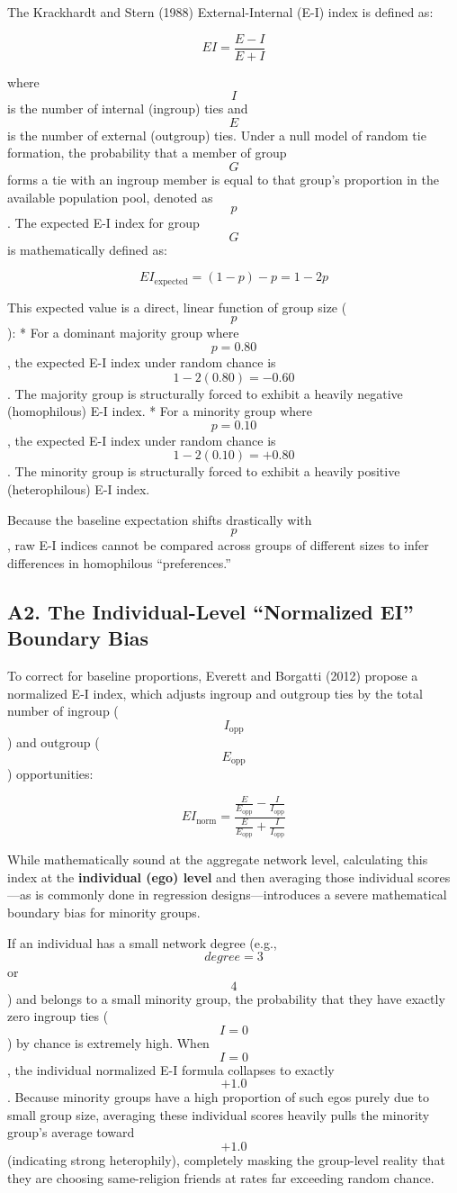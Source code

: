 \documentclass[
  letterpaper,
  DIV=11,
  numbers=noendperiod]{scrartcl}
\begin{document}
The Krackhardt and Stern (1988) External-Internal (E-I) index is defined
as:

\[EI = \frac{E - I}{E + I}\]

where \[I\] is the number of internal (ingroup) ties and \[E\] is the
number of external (outgroup) ties. Under a null model of random tie
formation, the probability that a member of group \[G\] forms a tie with
an ingroup member is equal to that group's proportion in the available
population pool, denoted as \[p\]. The expected E-I index for group
\[G\] is mathematically defined as:

\[EI_{\text{expected}} = (1 - p) - p = 1 - 2p\]

This expected value is a direct, linear function of group size (\[p\]):
* For a dominant majority group where \[p = 0.80\], the expected E-I
index under random chance is \[1 - 2(0.80) = -0.60\]. The majority group
is structurally forced to exhibit a heavily negative (homophilous) E-I
index. * For a minority group where \[p = 0.10\], the expected E-I index
under random chance is \[1 - 2(0.10) = +0.80\]. The minority group is
structurally forced to exhibit a heavily positive (heterophilous) E-I
index.

Because the baseline expectation shifts drastically with \[p\], raw E-I
indices cannot be compared across groups of different sizes to infer
differences in homophilous ``preferences.''

\subsection{A2. The Individual-Level ``Normalized EI'' Boundary
Bias}\label{a2.-the-individual-level-normalized-ei-boundary-bias}

To correct for baseline proportions, Everett and Borgatti (2012) propose
a normalized E-I index, which adjusts ingroup and outgroup ties by the
total number of ingroup (\[I_{\text{opp}}\]) and outgroup
(\[E_{\text{opp}}\]) opportunities:

\[EI_{\text{norm}} = \frac{\frac{E}{E_{\text{opp}}} - \frac{I}{I_{\text{opp}}}}{\frac{E}{E_{\text{opp}}} + \frac{I}{I_{\text{opp}}}}\]

While mathematically sound at the aggregate network level, calculating
this index at the \textbf{individual (ego) level} and then averaging
those individual scores---as is commonly done in regression
designs---introduces a severe mathematical boundary bias for minority
groups.

If an individual has a small network degree (e.g., \[degree = 3\] or
\[4\]) and belongs to a small minority group, the probability that they
have exactly zero ingroup ties (\[I = 0\]) by chance is extremely high.
When \[I = 0\], the individual normalized E-I formula collapses to
exactly \[+1.0\]. Because minority groups have a high proportion of such
egos purely due to small group size, averaging these individual scores
heavily pulls the minority group's average toward \[+1.0\] (indicating
strong heterophily), completely masking the group-level reality that
they are choosing same-religion friends at rates far exceeding random
chance.
\end{document}

